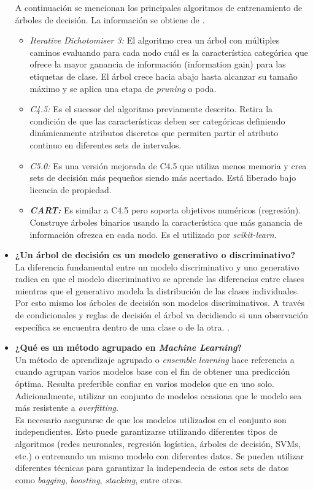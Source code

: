 \begin{itemize}
    A continuación se mencionan los principales algoritmos de entrenamiento de árboles de decisión. La información se obtiene de \cite{Sklearn-DT}.
    \begin{itemize}
        \item \textit{Iterative Dichotomiser 3:} El algoritmo crea un árbol con múltiples caminos evaluando para cada nodo cuál es la característica categórica que ofrece la mayor ganancia de información (information gain) para las etiquetas de clase. El árbol crece hacia abajo hasta alcanzar su tamaño máximo y se aplica una etapa de \textit{pruning} o poda. 
        \item \textit{C4.5:} Es el sucesor del algoritmo previamente descrito. Retira la condición de que las características deben ser categóricas definiendo dinámicamente atributos discretos que permiten partir el atributo continuo en diferentes sets de intervalos.
        \item \textit{C5.0:} Es una versión mejorada de C4.5 que utiliza menos memoria y crea sets de decisión más pequeños siendo más acertado. Está liberado bajo licencia de propiedad.
        \item \textit{\textbf{CART:}} Es similar a C4.5 pero soporta objetivos numéricos (regresión). Construye árboles binarios usando la característica que más ganancia de información ofrezca en cada nodo. Es el utilizado por \textit{scikit-learn}.
    \end{itemize}
    \item \textbf{¿Un árbol de decisión es un modelo generativo o discriminativo?}\\
    
    La diferencia fundamental entre un modelo discriminativo y uno generativo radica en que el modelo discriminativo se aprende las diferencias entre clases mientras que el generativo modela la distribución de las clases individuales. Por esto mismo los árboles de decisión son modelos discriminativos. A través de condicionales y reglas de decisión el árbol va decidiendo si una observación específica se encuentra dentro de una clase o de la otra. \cite{DvsG}.
    
    \item \textbf{¿Qué es un método agrupado en \textit{Machine Learning}?}\\
    
    Un método de aprendizaje agrupado o \textit{ensemble learning} hace referencia a cuando agrupan varios modelos base con el fin de obtener una predicción óptima. Resulta preferible confiar en varios modelos que en uno solo. Adicionalmente, utilizar un conjunto de modelos ocasiona que le modelo sea más resistente a \textit{overfitting}.\\
    Es necesario asegurarse de que los modelos utilizados en el conjunto son independientes. Esto puede garantizarse utilizando diferentes tipos de algoritmos (redes neuronales, regresión logística, árboles de decisión, SVMs, etc.) o entrenando un mismo modelo con diferentes datos. Se pueden utilizar diferentes técnicas para garantizar la independecia de estos sets de datos como \textit{bagging}, \textit{boosting}, \textit{stacking}, entre otros.  
    

\end{itemize}
